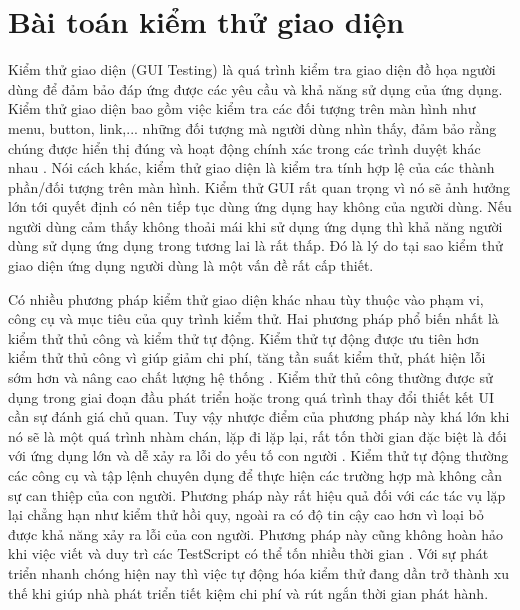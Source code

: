 \documentclass[a4paper, 12pt]{report}
\begin{document}
\section{Bài toán kiểm thử giao diện} 

Kiểm thử giao diện (GUI Testing) \cite{enwiki:1306186425} là quá trình kiểm tra giao diện đồ họa người dùng để đảm bảo đáp ứng được các yêu cầu và khả năng sử dụng của ứng dụng. Kiểm thử giao diện bao gồm việc kiểm tra các đối tượng trên màn hình như menu, button, link,... những đối tượng mà người dùng nhìn thấy, đảm bảo rằng chúng được hiển thị đúng và hoạt động chính xác trong các trình duyệt khác nhau \cite{memon2002gui}. Nói cách khác, kiểm thử giao diện là kiểm tra tính hợp lệ của các thành phần/đối tượng trên màn hình. Kiểm thử GUI rất quan trọng vì nó sẽ ảnh hưởng lớn tới quyết định có nên tiếp tục dùng ứng dụng hay không của người dùng. Nếu người dùng cảm thấy không thoải mái khi sử dụng ứng dụng thì khả năng người dùng sử dụng ứng dụng trong tương lai là rất thấp. Đó là lý do tại sao kiểm thử giao diện ứng dụng người dùng là một vấn đề rất cấp thiết.


Có nhiều phương pháp kiểm thử giao diện khác nhau tùy thuộc vào phạm vi, công cụ và mục tiêu của quy trình kiểm thử. Hai phương pháp phổ biến nhất là kiểm thử thủ công và kiểm thử tự động. Kiểm thử tự động được ưu tiên hơn kiểm thử thủ công vì giúp giảm chi phí, tăng tần suất kiểm thử, phát hiện lỗi sớm hơn và nâng cao chất lượng hệ thống \cite{6228988, alegroth2015visual}. Kiểm thử thủ công thường được sử dụng trong giai đoạn đầu phát triển hoặc trong quá trình thay đổi thiết kết UI cần sự đánh giá chủ quan. Tuy vậy nhược điểm của phương pháp này khá lớn khi nó sẽ là một quá trình nhàm chán, lặp đi lặp lại, rất tốn thời gian đặc biệt là đối với ứng dụng lớn và dễ xảy ra lỗi do yếu tố con người \cite{5070540, 4976392, finsterwalder2001automating, 4076909, dustin1999automated}. Kiểm thử tự động thường các công cụ và tập lệnh chuyên dụng để thực hiện các trường hợp mà không cần sự can thiệp của con người. Phương pháp này rất hiệu quả đối với các tác vụ lặp lại chẳng hạn như kiểm thử hồi quy, ngoài ra có độ tin cậy cao hơn vì loại bỏ được khả năng xảy ra lỗi của con người. Phương pháp này cũng không hoàn hảo khi việc viết và duy trì các \gls{TestScript} có thể tốn nhiều thời gian \cite{alégroth2016maintenanceautomatedtestsuites}. Với sự phát triển nhanh chóng hiện nay thì việc tự động hóa kiểm thử đang dần trở thành xu thế khi giúp nhà phát triển tiết kiệm chi phí và rút ngắn thời gian phát hành.
\end{document}
